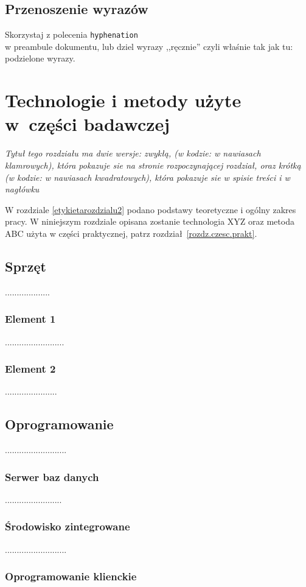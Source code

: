 \documentclass[12pt]{report}
\begin{document}
\section{Przenoszenie wyrazów}
Skorzystaj z polecenia {\tt hyphenation}\\ w preambule dokumentu, lub dziel
wyrazy ,,ręcznie'' czyli właśnie tak jak tu: po\-dzie\-lo\-ne wy\-ra\-zy. 

\chapter[Technologie i metody użyte...]{Technologie i metody użyte w~części
badawczej}

{\em Tytuł tego rozdziału ma dwie wersje: zwykłą, (w kodzie: w nawiasach
klamrowych), która
pokazuje sie na stronie rozpoczynającej rozdział, oraz krótką (w kodzie: w nawiasach
kwadratowych), która pokazuje sie w spisie treści i w nagłówku}

W rozdziale \ref{etykietarozdzialu2} podano podstawy teoretyczne i ogólny zakres
pracy. W niniejszym rozdziale opisana zostanie technologia XYZ oraz metoda ABC
użyta w części praktycznej, patrz rozdział~\ref{rozdz.czesc.prakt}. 

\section{Sprzęt}
...................
\subsection{Element 1}
.........................
\subsection{Element 2}
......................

\section{Oprogramowanie}
..........................
\subsection{Serwer baz danych}
........................
\subsection{Środowisko zintegrowane}
..........................
\subsection{Oprogramowanie klienckie}
\end{document}
